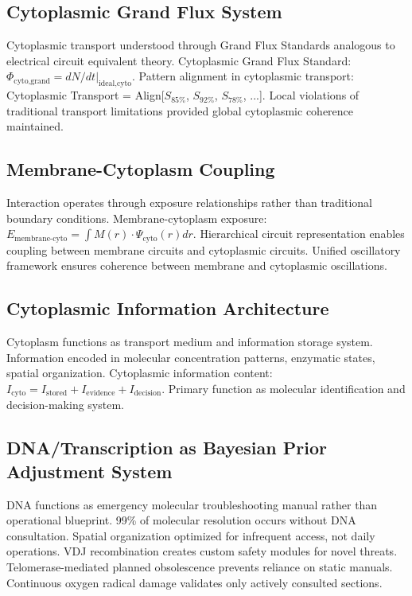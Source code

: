 \documentclass[12pt,a4paper]{article}
\begin{document}
\subsection{Cytoplasmic Grand Flux System}

Cytoplasmic transport understood through Grand Flux Standards analogous to electrical circuit equivalent theory. Cytoplasmic Grand Flux Standard: $\Phi_{\text{cyto,grand}} = dN/dt|_{\text{ideal,cyto}}$. Pattern alignment in cytoplasmic transport: Cytoplasmic Transport = Align[$S_{85\%}$, $S_{92\%}$, $S_{78\%}$, ...]. Local violations of traditional transport limitations provided global cytoplasmic coherence maintained.

\subsection{Membrane-Cytoplasm Coupling}

Interaction operates through exposure relationships rather than traditional boundary conditions. Membrane-cytoplasm exposure: $E_{\text{membrane-cyto}} = \int M(r) \cdot \Psi_{\text{cyto}}(r) dr$. Hierarchical circuit representation enables coupling between membrane circuits and cytoplasmic circuits. Unified oscillatory framework ensures coherence between membrane and cytoplasmic oscillations.

\subsection{Cytoplasmic Information Architecture}

Cytoplasm functions as transport medium and information storage system. Information encoded in molecular concentration patterns, enzymatic states, spatial organization. Cytoplasmic information content: $I_{\text{cyto}} = I_{\text{stored}} + I_{\text{evidence}} + I_{\text{decision}}$. Primary function as molecular identification and decision-making system.

\subsection{DNA/Transcription as Bayesian Prior Adjustment System}

DNA functions as emergency molecular troubleshooting manual rather than operational blueprint. 99\% of molecular resolution occurs without DNA consultation. Spatial organization optimized for infrequent access, not daily operations. VDJ recombination creates custom safety modules for novel threats. Telomerase-mediated planned obsolescence prevents reliance on static manuals. Continuous oxygen radical damage validates only actively consulted sections.
\end{document}
